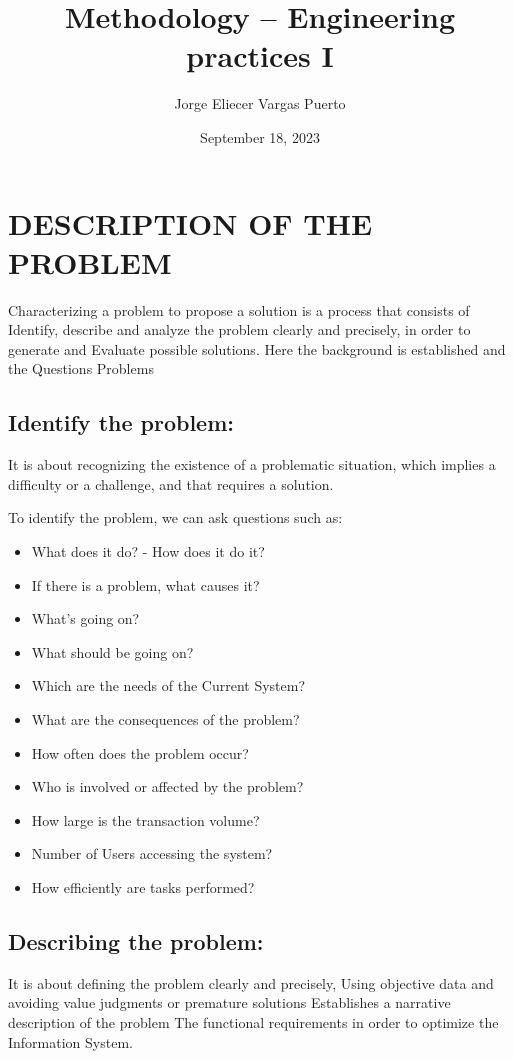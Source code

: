 \documentclass{article}
\title{Methodology – Engineering practices I}
\author{Jorge Eliecer Vargas Puerto}
\date{September 18, 2023}
\begin{document}
\maketitle

\tableofcontents

\section{DESCRIPTION OF THE PROBLEM}
\par Characterizing a problem to propose a solution is a process that consists
of Identify, describe and analyze the problem clearly and precisely, in order to
generate and Evaluate possible solutions. Here the background is established and
the Questions Problems

\subsection{Identify the problem:}
\par It is about recognizing the existence of a problematic situation, which
implies a difficulty or a challenge, and that requires a solution.

\par To identify the problem, we can ask questions such as:

\begin{itemize}
	\item What does it do? - How does it do it?
	\item If there is a problem, what causes it?
	\item What's going on?
	\item What should be going on?
	\item Which are the needs of the Current System?
	\item What are the consequences of the problem?
	\item How often does the problem occur?
	\item Who is involved or affected by the problem?
	\item How large is the transaction volume?
	\item Number of Users accessing the system?
	\item How efficiently are tasks performed?
\end{itemize}

\subsection{Describing the problem:}
\par It is about defining the problem clearly and precisely, Using objective
data and avoiding value judgments or premature solutions Establishes a narrative
description of the problem The functional requirements in order to optimize the
Information System.
\end{document}
